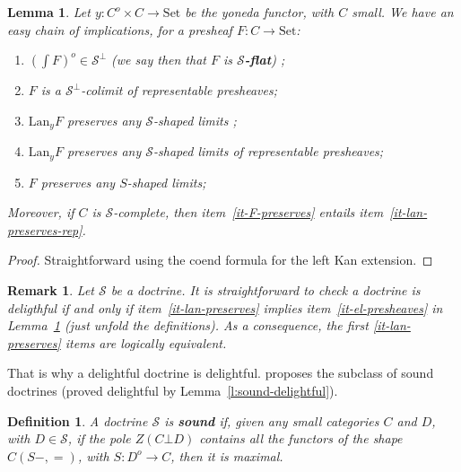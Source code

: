 \documentclass{article}
\newcommand{\Lan}{\text{Lan}}
\newcommand{\Set}{\text{Set}}
\newtheorem{definition}[theorem]{Definition}
\newtheorem{remark}[theorem]{Remark}
\newtheorem{lemma}[theorem]{Lemma}
\begin{document}
  \begin{lemma}
    \label{l:flat-implications}
    Let $y : C^o \times C \rightarrow \Set$ be the yoneda functor, with $C$ small.
We have an easy chain of implications, for a presheaf $F : C \rightarrow \Set$:
\begin{enumerate}
\item $(\int F)^o \in \mathcal{S}^{\bot}$ (we say then that $F$ is \textbf{$\mathcal{S}$-flat}) \label{it-el-presheaves};
\item $F$ is a $\mathcal{S}^{\bot}$-colimit of representable presheaves;
\item $\Lan_yF$ preserves any $\mathcal{S}$-shaped limits
  \label{it-lan-preserves};
\item $\Lan_yF$ preserves any $\mathcal{S}$-shaped limits of representable presheaves;
  \label{it-lan-preserves-rep}
  \item $F$ preserves any $S$-shaped limits;
    \label{it-F-preserves}
\end{enumerate}
Moreover, if $C$ is $\mathcal{S}$-complete, then
item~\ref{it-F-preserves} entails item~\ref{it-lan-preserves-rep}.
\end{lemma}
\begin{proof}
 Straightforward using the coend formula for the left Kan extension. 
\end{proof}
\begin{remark}
  Let $\mathcal{S}$ be a doctrine.
  It is straightforward to check a doctrine is deligthful if and only if
  item~\ref{it-lan-preserves} implies item~\ref{it-el-presheaves} 
  in Lemma~\ref{l:flat-implications} (just unfold the definitions).
  As a consequence, the first \ref{it-lan-preserves} items
  are logically equivalent.
\end{remark}
That is why a delightful doctrine is delightful.
\cite{lack_accessible} proposes the subclass of sound doctrines
(proved delightful by Lemma~\ref{l:sound-delightful}).
\begin{definition}
  A doctrine $\mathcal{S}$ is \textbf{sound} \cite[Definition 2.2]{lack_accessible}
  if, given any small categories $C$ and $D$, with $D \in \mathcal{S}$,
  if the pole $Z(C \bot D)$ contains all the functors of the shape $C(S -,=)$, with $S :
  D^o \rightarrow C$, then it is maximal.
\end{definition}
\end{document}
